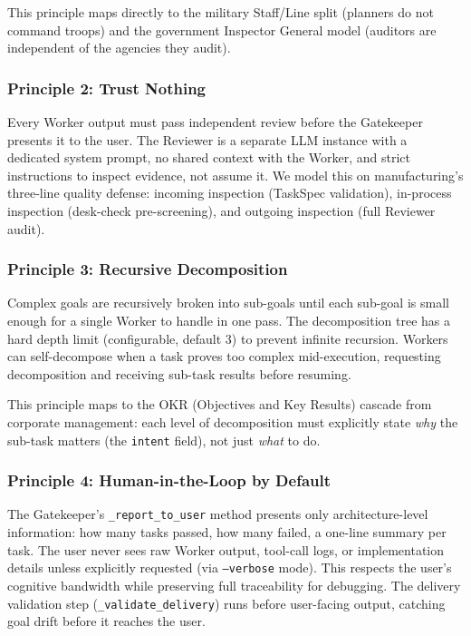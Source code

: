 \documentclass[11pt,a4paper]{article}
\begin{document}
This principle maps directly to the military Staff/Line split (planners do not
command troops) and the government Inspector General model (auditors are
independent of the agencies they audit).

\subsubsection*{Principle 2: Trust Nothing}
\label{sec:trust-nothing}

Every Worker output must pass independent review before the Gatekeeper
presents it to the user. The Reviewer is a separate LLM instance with a
dedicated system prompt, no shared context with the Worker, and strict
instructions to inspect evidence, not assume it. We model this on
manufacturing's three-line quality defense: incoming inspection (TaskSpec
validation), in-process inspection (desk-check pre-screening), and outgoing
inspection (full Reviewer audit).

\subsubsection*{Principle 3: Recursive Decomposition}
\label{sec:recursive-decomp}

Complex goals are recursively broken into sub-goals until each sub-goal is
small enough for a single Worker to handle in one pass. The decomposition tree
has a hard depth limit (configurable, default 3) to prevent infinite recursion.
Workers can self-decompose when a task proves too complex mid-execution,
requesting decomposition and receiving sub-task results before resuming.

This principle maps to the OKR (Objectives and Key Results) cascade from
corporate management: each level of decomposition must explicitly state
\emph{why} the sub-task matters (the \texttt{intent} field), not just
\emph{what} to do.

\subsubsection*{Principle 4: Human-in-the-Loop by Default}
\label{sec:human-in-loop}

The Gatekeeper's \texttt{\_report\_to\_user} method presents only
architecture-level information: how many tasks passed, how many failed,
a one-line summary per task. The user never sees raw Worker output, tool-call
logs, or implementation details unless explicitly requested (via \texttt{--verbose} mode).
This respects the user's cognitive bandwidth while preserving full
traceability for debugging. The delivery validation step
(\texttt{\_validate\_delivery}) runs before user-facing output, catching
goal drift before it reaches the user.
\end{document}
